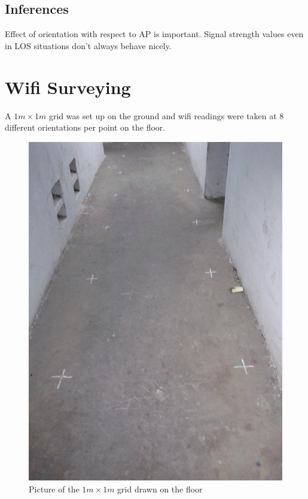 
\subsection{Inferences}
Effect of orientation with respect to AP is important. Signal strength values
even in LOS situations don't always behave nicely.

\section{Wifi Surveying}

A $1m \times 1m$ grid was set up on the ground and wifi readings were taken at 8
different orientations per point on the floor.


\begin{figure}
    \centering
    \includegraphics[width=5in,angle=270]{figures/grid_pic}
    \caption{Picture of the $1m \times 1m$ grid drawn on the floor}
\end{figure}

